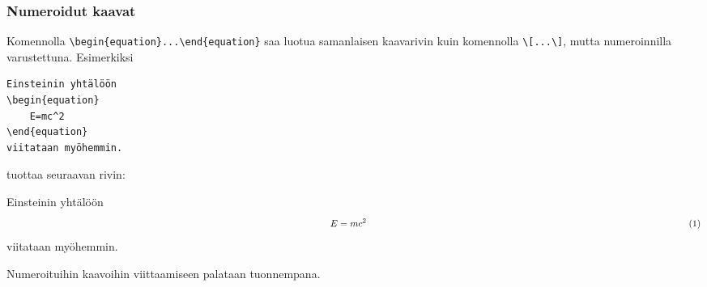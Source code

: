 \begin{frame}[fragile]
    \frametitle{Numeroidut kaavat}
Komennolla \verb-\begin{equation}...\end{equation}- saa luotua samanlaisen kaavarivin kuin komennolla \verb-\[...\]-, mutta numeroinnilla varustettuna. \pause Esimerkiksi

    \begin{scriptsize}
        \begin{Verbatim}[frame=single]
Einsteinin yhtälöön
\begin{equation}
    E=mc^2
\end{equation}
viitataan myöhemmin.
        \end{Verbatim}
    \end{scriptsize}

    tuottaa seuraavan rivin:
    \begin{sample}
        Einsteinin yhtälöön
        \begin{equation*}
            \hskip\textwidth minus \textwidth E=mc^2 \hskip\textwidth minus \textwidth (1)
        \end{equation*}
        viitataan myöhemmin.
    \end{sample}
    \pause
    Numeroituihin kaavoihin viittaamiseen palataan tuonnempana.
\end{frame}
\begin{frame}[fragile]
    
\end{frame}
